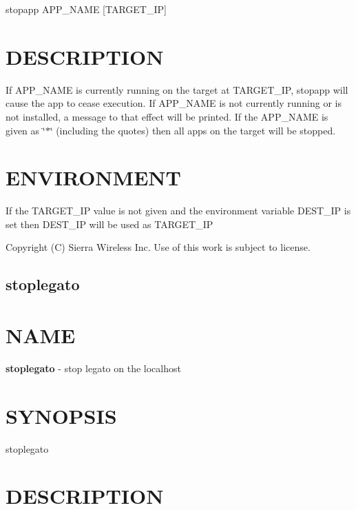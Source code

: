 {\ttfamily stopapp A\+P\+P\+\_\+\+N\+A\+M\+E \mbox{[}T\+A\+R\+G\+E\+T\+\_\+\+I\+P\mbox{]}}~\newline


\section*{D\+E\+S\+C\+R\+I\+P\+T\+I\+O\+N}

If A\+P\+P\+\_\+\+N\+A\+M\+E is currently running on the target at T\+A\+R\+G\+E\+T\+\_\+\+I\+P, stopapp will cause the app to cease execution. If A\+P\+P\+\_\+\+N\+A\+M\+E is not currently running or is not installed, a message to that effect will be printed. If the A\+P\+P\+\_\+\+N\+A\+M\+E is given as \char`\"{}$\ast$\char`\"{} (including the quotes) then all apps on the target will be stopped.

\section*{E\+N\+V\+I\+R\+O\+N\+M\+E\+N\+T}

\begin{DoxyVerb}If the TARGET_IP value is not given and the environment variable DEST_IP
is set then DEST_IP will be used as TARGET_IP
\end{DoxyVerb}




 Copyright (C) Sierra Wireless Inc. Use of this work is subject to license. \hypertarget{toolsHost_stoplegato}{}\subsection{stoplegato}\label{toolsHost_stoplegato}
\section*{N\+A\+M\+E}

{\bfseries stoplegato} -\/ stop legato on the localhost

\section*{S\+Y\+N\+O\+P\+S\+I\+S}

{\ttfamily stoplegato }~\newline


\section*{D\+E\+S\+C\+R\+I\+P\+T\+I\+O\+N}

